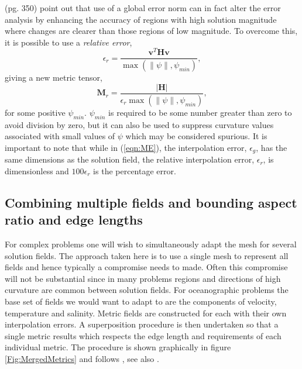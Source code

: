 \cite{george1998} (pg. 350) point out that use of a global error norm
can in fact alter the error analysis by enhancing the accuracy of
regions with high solution magnitude where changes are clearer than
those regions of low magnitude. To overcome this, it is possible to
use a {\it relative error},
\begin{equation*}\label{eqn:relative_error_3D}
  \epsilon_r=\frac{\pmb{v}^T \pmb{H} \pmb{v}}{\max(\|\psi\|, \psi_{min})},
\end{equation*}
giving a new metric tensor,
\begin{equation*}\label{eqn:relative_metric}
  \pmb{M}_r = \frac{\vert\pmb{H}\vert}{\epsilon_r\max(\|\psi\|, \psi_{min})},
\end{equation*}
for some positive $\psi_{min}$. $\psi_{min}$ is required to be some
number greater than zero to avoid division by zero, but it can also be
used to suppress curvature values associated with small values of
$\psi$ which may be considered spurious. It is important to note that
while in (\ref{eqn:ME}), the interpolation error, $\epsilon_g$, has
the same dimensions as the solution field, the relative interpolation
error, $\epsilon_r$, is dimensionless and $100\epsilon_r$ is the
percentage error.


\subsection{Combining multiple fields and bounding aspect ratio and edge lengths}

For complex problems one will wish to simultaneously adapt the mesh
for several solution fields. The approach taken here is to use a
single mesh to represent all fields and hence typically a compromise
needs to made. Often this compromise will not be substantial since in
many problems regions and directions of high curvature are common
between solution fields. For oceanographic problems the base set of
fields we would want to adapt to are the components of velocity,
temperature and salinity. Metric fields are constructed for each with
their own interpolation errors. A superposition procedure is then
undertaken so that a single metric results which respects the edge
length and requirements of each individual metric. The procedure is
shown graphically in figure \ref{Fig:MergedMetrics} and follows
\cite{pain2001}, see also \cite{castrodiaz1997,george1998}.

